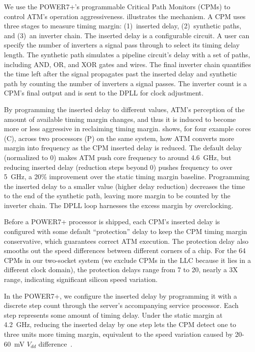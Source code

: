 We use the POWER7+'s programmable Critical Path Monitors (CPMs) to control ATM's operation aggressiveness.  illustrates the mechanism. A CPM uses three stages to measure timing margin: (1)~inserted delay, (2)~synthetic paths, and (3)~an inverter chain. The inserted delay is a configurable circuit. A user can specify the number of inverters a signal pass through to select its timing delay length. The synthetic path simulates a pipeline circuit's delay with a set of paths, including AND, OR, and XOR gates and wires. The final inverter chain quantifies the time left after the signal propagates past the inserted delay and synthetic path by counting the number of inverters a signal passes. The inverter count is a CPM's final output and is sent to the DPLL for clock adjustment.

By programming the inserted delay to different values, ATM's perception of the amount of available timing margin changes, and thus it is induced to become more or less aggressive in reclaiming timing margin.  shows, for four example cores (C), across two processors (P) on the same system, how ATM converts more margin into frequency as the CPM inserted delay is reduced. The default delay (normalized to 0) makes ATM push core frequency to around 4.6~GHz, but reducing inserted delay (reduction steps beyond 0) pushes frequency to over 5~GHz, a 20\% improvement over the static timing margin baseline. Programming the inserted delay to a smaller value (higher delay reduction) decreases the time to the end of the synthetic path, leaving more margin to be counted by the inverter chain. The DPLL loop harnesses the excess margin by overclocking.

Before a POWER7+ processor is shipped, each CPM's inserted delay is configured with some default ``protection'' delay to keep the CPM timing margin conservative, which guarantees correct ATM execution. The protection delay also smooths out the speed differences between different corners of a chip. For the 64 CPMs in our two-socket system (we exclude CPMs in the LLC because it lies in a different clock domain), the protection delays range from 7 to 20, nearly a 3X range, indicating significant silicon speed variation.

In the POWER7+, we configure the inserted delay by programming it with a discrete step count through the server's accompanying service processor. Each step represents some amount of timing delay. Under the static margin at 4.2~GHz, reducing the inserted delay by one step lets the CPM detect one to three units more timing margin, equivalent to the speed variation caused by 20-60~mV $V_{dd}$ difference~\cite{drake2013single,zu2015adaptive}.

